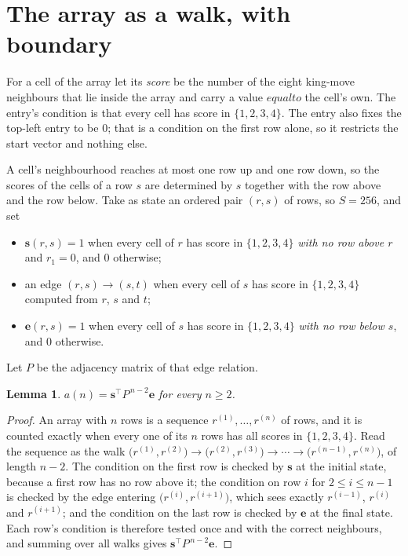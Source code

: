 \documentclass[11pt,a4paper]{article}
\theoremstyle{plain}
\newtheorem{lemma}[theorem]{Lemma}
\theoremstyle{definition}
\begin{document}
\section{The array as a walk, with boundary}

For a cell of the array let its \emph{score} be the number of the eight king-move neighbours that lie inside
the array and carry a value $equal to$ the cell's own. The entry's condition is that every cell
has score in $\{1,2,3,4\}$. The entry also fixes the top-left entry to be $0$; that is a condition on the first row alone, so it restricts the start vector and nothing else.

A cell's neighbourhood reaches at most one row up and one row down, so the scores of the
cells of a row $s$ are determined by $s$ together with the row above and the row below.
Take as state an ordered pair $(r,s)$ of rows, so $S=256$, and set
\begin{itemize}
\item $\mathbf{s}(r,s)=1$ when every cell of $r$ has score in $\{1,2,3,4\}$ \emph{with no row
above $r$} and $r_1=0$, and $0$ otherwise;
\item an edge $(r,s)\to(s,t)$ when every cell of $s$ has score in $\{1,2,3,4\}$ computed from
$r$, $s$ and $t$;
\item $\mathbf{e}(r,s)=1$ when every cell of $s$ has score in $\{1,2,3,4\}$ \emph{with no row
below $s$}, and $0$ otherwise.
\end{itemize}
Let $P$ be the adjacency matrix of that edge relation.

\begin{lemma}\label{lem:walk}
$a(n)=\mathbf{s}^{\!\top}P^{\,n-2}\mathbf{e}$ for every $n\ge2$.
\end{lemma}

\begin{proof}
An array with $n$ rows is a sequence $r^{(1)},\dots,r^{(n)}$ of rows, and it is counted
exactly when every one of its $n$ rows has all scores in $\{1,2,3,4\}$. Read the sequence as the
walk $\bigl(r^{(1)},r^{(2)}\bigr)\to\bigl(r^{(2)},r^{(3)}\bigr)\to\cdots\to
\bigl(r^{(n-1)},r^{(n)}\bigr)$, of length $n-2$. The condition on the first row is
checked by $\mathbf{s}$ at the initial state, because a first row has no row above it; the
condition on row $i$ for $2\le i\le n-1$ is checked by the edge entering
$\bigl(r^{(i)},r^{(i+1)}\bigr)$, which sees exactly $r^{(i-1)}$, $r^{(i)}$ and
$r^{(i+1)}$; and the condition on the last row is checked by $\mathbf{e}$ at the final
state. Each row's condition is therefore tested once and with the correct neighbours, and
summing over all walks gives $\mathbf{s}^{\!\top}P^{\,n-2}\mathbf{e}$.
\end{proof}
\end{document}
